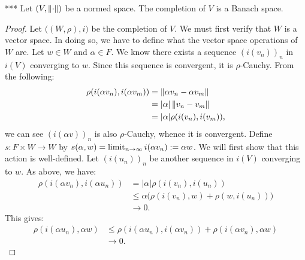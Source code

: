     \begin{theorem}***\label{thm:completion-of-norm}
        Let $(V,\left\lVert \cdot \right\rVert)$ be a normed space. The completion of $V$ is a Banach space.
    \end{theorem}
        \begin{proof}
            Let $\bigl((W,\rho),i\bigr)$ be the completion of $V$. We must first verify that $W$ is a vector space. In doing so, we have to define what the vector space operations of $W$ are. Let $w \in W$ and $\alpha \in F$. We know there exists a sequence $(i(v_n))_n$ in $i(V)$ converging to $w$. Since this sequence is convergent, it is $\rho$-Cauchy. From the following:
                \begin{equation*}
                \begin{split}
                    \rho(i(\alpha v_n), i(\alpha v_m))
                    & = \left\lVert \alpha v_n - \alpha v_m \right\rVert \\
                    & = |\alpha| \left\lVert v_n - v_m \right\rVert \\
                    & = |\alpha| \rho(i(v_n),i(v_m)),
                \end{split}
                \end{equation*}
            we can see $(i(\alpha v))_n$ is also $\rho$-Cauchy, whence it is convergent. Define $s:F \times W \rightarrow W$ by $s(\alpha,w) = \operatorname*{limit}_{n \rightarrow \infty} i(\alpha v_n) := \alpha w$. We will first show that this action is well-defined. Let $(i(u_n))_n$ be another sequence in $i(V)$ converging to $w$. As above, we have:
                \begin{equation*}
                \begin{split}
                    \rho(i(\alpha v_n), i(\alpha u_n))
                    & = |\alpha| \rho(i(v_n), i( u_n)) \\
                    & \leq \alpha \bigl( \rho(i(v_n),w) + \rho(w, i(u_n))\bigr) \\
                    & \rightarrow 0.
                \end{split}
                \end{equation*}
            This gives:
                \begin{equation*}
                \begin{split}
                    \rho(i(\alpha u_n), \alpha w) 
                    & \leq \rho(i(\alpha u_n), i(\alpha v_n)) + \rho(i(\alpha v_n),\alpha w) \\
                    & \rightarrow 0.

\end{split}
\end{equation*}
\end{proof}
